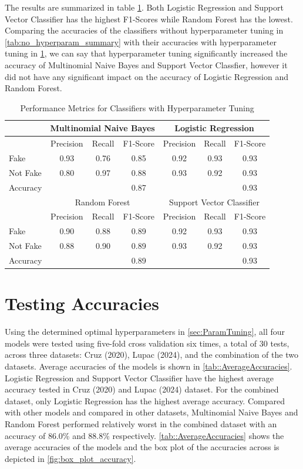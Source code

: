 The results are summarized in table \ref{tab:hyperparam_summary}. Both Logistic Regression and Support Vector Classifier has the highest F1-Scores while Random Forest has the lowest. Comparing the accuracies of the classifiers without hyperparameter tuning in \ref{tab:no_hyperparam_summary} with their accuracies with hyperparameter tuning in \ref{tab:hyperparam_summary}, we can say that hyperparameter tuning significantly increased the accuracy of Multinomial Naive Bayes and Support Vector Classfier, however it did not have any significant impact on the accuracy of Logistic Regression and Random Forest.

\begin{table}[ht]
    \centering
    \begin{tabular}{|l|ccc|ccc|}
    \hline
    & \multicolumn{3}{c|}{Multinomial Naive Bayes} & \multicolumn{3}{c|}{Logistic Regression} \\
    \hline
    & Precision & Recall & F1-Score & Precision & Recall & F1-Score \\
    \hline
    Fake & 0.93 & 0.76 & 0.85 & 0.92 & 0.93 & 0.93 \\
    Not Fake & 0.80 & 0.97 & 0.88 & 0.93 & 0.92 & 0.93 \\
    Accuracy & & & 0.87 & & & 0.93 \\
    \hline
    & \multicolumn{3}{c|}{Random Forest} & \multicolumn{3}{c|}{Support Vector Classifier} \\
    \hline
    & Precision & Recall & F1-Score & Precision & Recall & F1-Score \\
    \hline
    Fake & 0.90 & 0.88 & 0.89 & 0.92 & 0.93 & 0.93 \\
    Not Fake & 0.88 & 0.90 & 0.89 & 0.93 & 0.92 & 0.93 \\
    Accuracy & & & 0.89 & & & 0.93 \\
    \hline
    \end{tabular}
    \caption{Performance Metrics for Classifiers with Hyperparameter Tuning}
    \label{tab:hyperparam_summary}
\end{table}
    
\section{Testing Accuracies}
Using the determined optimal hyperparameters in \ref{sec:ParamTuning}, all four models were tested using five-fold cross validation six times, a total of 30 tests, across three datasets: Cruz (2020), Lupac (2024), and the combination of the two datasets. Average accuracies of the models is shown in \ref{tab::AverageAccuracies}. Logistic Regression and Support Vector Classifier have the highest average accuracy tested in Cruz (2020) and Lupac (2024) dataset. For the combined dataset, only Logistic Regression has the highest average accuracy. Compared with other models and compared in other datasets, Multinomial Naive Bayes and Random Forest performed relatively worst in the combined dataset with an accuracy of 86.0\% and 88.8\% respectively. \ref{tab::AverageAccuracies} shows the average accuracies of the models and the box plot of the accuracies across is depicted in \ref{fig:box_plot_accuracy}.

